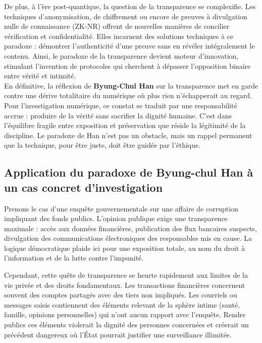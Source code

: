 \documentclass[12pt,a4paper]{article}
\begin{document}
	De plus, à l’ère post-quantique, la question de la transparence se complexifie. Les techniques d’anonymisation, de chiffrement ou encore de preuves à divulgation nulle de connaissance (ZK-NR) offrent de nouvelles manières de concilier vérification et confidentialité. Elles incarnent des solutions techniques à ce paradoxe : démontrer l’authenticité d’une preuve sans en révéler intégralement le contenu. Ainsi, le paradoxe de la transparence devient moteur d’innovation, stimulant l’invention de protocoles qui cherchent à dépasser l’opposition binaire entre vérité et intimité.\\

	
	En définitive, la réflexion de \textbf{ Byung-Chul Han} sur la transparence met en garde contre une dérive totalitaire du numérique où plus rien n’échapperait au regard. Pour l’investigation numérique, ce constat se traduit par une responsabilité accrue : produire de la vérité sans sacrifier la dignité humaine. C’est dans l’équilibre fragile entre exposition et préservation que réside la légitimité de la discipline. Le paradoxe de Han n’est pas un obstacle, mais un rappel permanent que la technique, pour être juste, doit être guidée par l’éthique.
	
	\subsection{ Application du paradoxe de Byung-chul Han à un cas concret d'investigation }
	
	Prenons le cas d’une enquête gouvernementale sur une affaire de corruption impliquant des fonds publics. L’opinion publique exige une transparence maximale : accès aux données financières, publication des flux bancaires suspects, divulgation des communications électroniques des responsables mis en cause. La logique démocratique plaide ici pour une exposition totale, au nom du droit à l’information et de la lutte contre l’impunité.
	
	Cependant, cette quête de transparence se heurte rapidement aux limites de la vie privée et des droits fondamentaux. Les transactions financières concernent souvent des comptes partagés avec des tiers non impliqués. Les courriels ou messages saisis contiennent des éléments relevant de la sphère intime (santé, famille, opinions personnelles) qui n’ont aucun rapport avec l’enquête. Rendre publics ces éléments violerait la dignité des personnes concernées et créerait un précédent dangereux où l’État pourrait justifier une surveillance illimitée.
	
\end{document}
